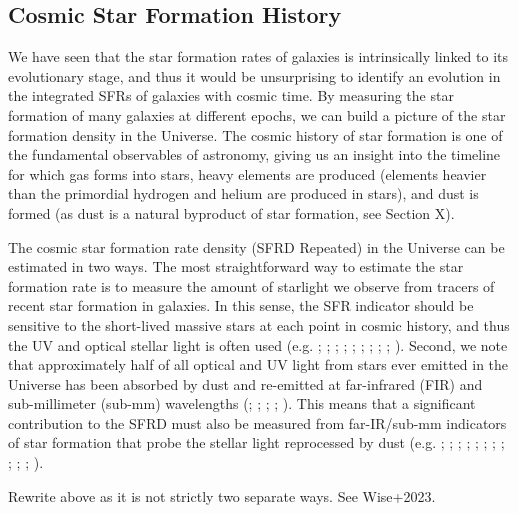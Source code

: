 \subsection{Cosmic Star Formation History}
\label{sec:cosmic_star_formation_history}

We have seen that the star formation rates of galaxies is intrinsically linked to its evolutionary stage, and thus it would be unsurprising to identify an evolution in the integrated SFRs of galaxies with cosmic time. By measuring the star formation of many galaxies at different epochs, we can build a picture of the star formation density in the Universe. The cosmic history of star formation is one of the fundamental observables of astronomy, giving us an insight into the timeline for which gas forms into stars, heavy elements are produced (elements heavier than the primordial hydrogen and helium are produced in stars), and dust is formed (as dust is a natural byproduct of star formation, see Section {\color{red}X}).

The cosmic star formation rate density (SFRD {\color{red}Repeated}) in the Universe can be estimated in two ways. The most straightforward way to estimate the star formation rate is to measure the amount of starlight we observe from tracers of recent star formation in galaxies. In this sense, the SFR indicator should be sensitive to the short-lived massive stars at each point in cosmic history, and thus the UV and optical stellar light is often used (e.g. \citealt{Madau_1996}; \citealt{Lilly_1996}; \citealt{Wyder_2005}; \citealt{Schiminovich_2005}; \citealt{Dahlen_2007}; \citealt{Reddy_2009}; \citealt{Robotham_2011}; \citealt{Cucciati_2012}; \citealt{Schenker_2013}; \citealt{Finkelstein_2015}). Second, we note that approximately half of all optical and UV light from stars ever emitted in the Universe has been absorbed by dust and re-emitted at far-infrared (FIR) and sub-millimeter (sub-mm) wavelengths (\citealt{Puget_1996}; \citealt{Fixsen_1998}; \citealt{Dole_2006}; \citealt{Driver_2008}; \citealt{Driver_2016}). This means that a significant contribution to the SFRD must also be measured from far-IR/sub-mm indicators of star formation that probe the stellar light reprocessed by dust (e.g. \citealt{Magnelli_2011}; \citealt{Casey_2012}; \citealt{Magnelli_2013}; \citealt{Gruppioni_2013}; \citealt{Swinbank_2014}; \citealt{Bouwens_2016}; \citealt{Bourne_2017}; \citealt{Koprowski_2017}; \citealt{Novak_2017}; \citealt{Liu_2018}; \citealt{Bouwens_2020}; \citealt{Dudzeviciute_2020}).

{\color{red}Rewrite above as it is not strictly two separate ways. See Wise+2023.}


